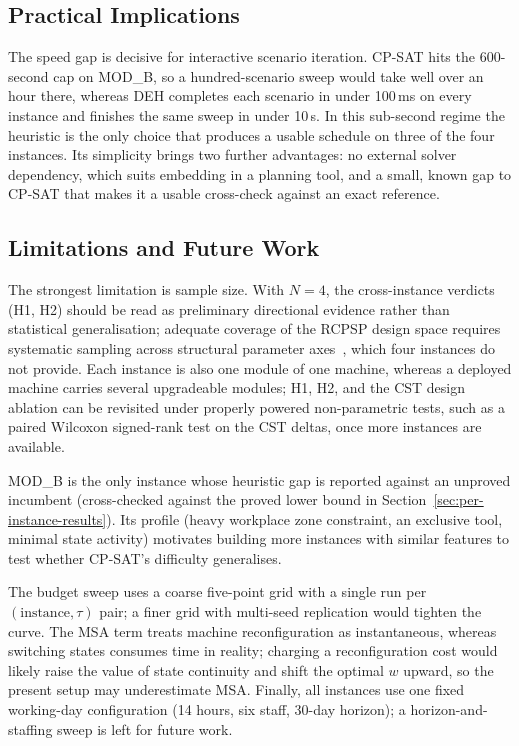 \documentclass[conference]{IEEEtran}
\begin{document}
\subsection{Practical Implications}

The speed gap is decisive for interactive scenario iteration. CP-SAT
hits the 600-second cap on MOD\_B, so a hundred-scenario sweep
would take well over an hour there, whereas DEH completes each
scenario in under 100\,ms on every instance and finishes the same
sweep in under 10\,s. In this sub-second regime the heuristic is the
only choice that produces a usable schedule on three of the four
instances. Its simplicity brings two further advantages: no external
solver dependency, which suits embedding in a planning tool, and a
small, known gap to CP-SAT that makes it a usable cross-check against
an exact reference.

\subsection{Limitations and Future Work}
\label{sec:limitations}

The strongest limitation is sample size. With $N = 4$, the
cross-instance verdicts (H1, H2) should be read as preliminary
directional evidence rather than statistical generalisation; adequate
coverage of the RCPSP design space requires systematic sampling
across structural parameter axes~\cite{vanhoucke2008measurement},
which four instances do not provide. Each instance is also one module
of one machine, whereas a deployed machine carries several upgradeable
modules; H1, H2, and the CST design ablation can be revisited under
properly powered non-parametric tests, such as a paired Wilcoxon
signed-rank test on the CST deltas, once more instances are available.

MOD\_B is the only instance whose heuristic gap is reported against
an unproved incumbent (cross-checked against the proved lower bound in
Section~\ref{sec:per-instance-results}). Its profile (heavy workplace zone
constraint, an exclusive tool, minimal state activity) motivates
building more instances with similar features to test whether
CP-SAT's difficulty generalises.

The budget sweep uses a coarse five-point grid with a single run per
$(\text{instance}, \tau)$ pair; a finer grid with multi-seed
replication would tighten the curve. The MSA term treats machine
reconfiguration as instantaneous, whereas switching states consumes
time in reality; charging a reconfiguration cost would likely raise
the value of state continuity and shift the optimal $w$ upward, so the
present setup may underestimate MSA. Finally, all instances use one
fixed working-day configuration (14 hours, six staff, 30-day horizon);
a horizon-and-staffing sweep is left for future work.
\end{document}
